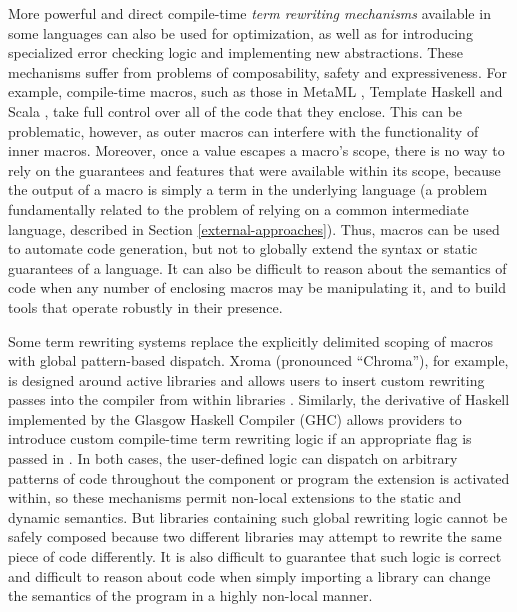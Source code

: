 More powerful and direct compile-time \emph{term rewriting mechanisms} available in some languages can also be used for optimization, as well as for introducing specialized error checking logic and implementing new abstractions. These mechanisms  suffer from problems of composability, safety and expressiveness. For example, compile-time macros, such as those in MetaML \cite{Sheard:1999:UMS}, Template Haskell \cite{SheardPeytonJones:Haskell-02} and Scala \cite{scala-macros}, take full control over all of the code that they enclose. This can be problematic, however, as outer macros can interfere with the functionality of inner macros. Moreover, once a value escapes a macro's scope, there is no way to rely on the guarantees and features that were available within its scope, because the output of a macro is simply a term in the underlying language (a problem fundamentally related to the problem of relying on a common intermediate language,  described in Section \ref{external-approaches}). Thus, macros can be used to automate code generation, but not to globally extend the syntax or static guarantees of a language. It can also be difficult to reason about the semantics of code when any number of enclosing macros may be manipulating it, and to build tools that operate robustly in their presence.

Some term rewriting systems replace the explicitly delimited scoping of macros with global pattern-based dispatch. Xroma (pronounced ``Chroma''), for example, is designed around active libraries and allows users to insert custom rewriting passes into the compiler from within libraries \cite{activelibraries}. Similarly, the derivative of Haskell implemented by the Glasgow Haskell Compiler (GHC) allows providers to introduce custom compile-time term rewriting logic if an appropriate flag is passed in \cite{jones2001playing}. In both cases, the user-defined logic can dispatch on arbitrary patterns of code throughout the component or program the extension is activated within, so these mechanisms permit non-local extensions to the static and dynamic semantics. But libraries containing such global rewriting logic cannot be safely composed because two different libraries may attempt to rewrite the same piece of code differently. It is also difficult to guarantee that such logic is correct and difficult to reason about code when simply importing a library can change the semantics of the program in a highly non-local manner.

